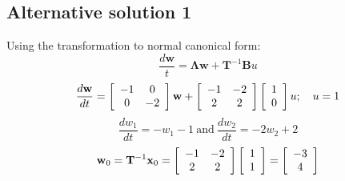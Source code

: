 \subsection*{Alternative solution 1}
Using the transformation to normal canonical form:
\[
\frac{d\mathbf{w}}{t}=\mathbf{\Lambda w}+ \mathbf{T}^{-1}\mathbf{B}u
\]
\[
\frac{{d{\bf{w}}}}{{dt}} = \left[ {\begin{array}{*{20}c}
   { - 1} & 0  \\
   0 & { - 2}  \\
\end{array}} \right]{\bf{w}} + \left[ {\begin{array}{*{20}c}
   { - 1} & { - 2}  \\
   2 & 2  \\
\end{array}} \right]\left[ {\begin{array}{*{20}c}
   1  \\
   0  \\
\end{array}} \right]u;\quad u = 1
\]
\[
\frac{dw_1}{dt}=-w_1-1\ \textrm{and}\ \frac{dw_2}{dt}=-2w_2 + 2
\]
\[
{\bf{w}}_0  = {\bf{T}}^{ - 1} {\bf{x}}_0  = \left[ {\begin{array}{*{20}c}
   { - 1} & { - 2}  \\
   2 & 2  \\
\end{array}} \right]\left[ {\begin{array}{*{20}c}
   1  \\
   1  \\
\end{array}} \right] = \left[ {\begin{array}{*{20}c}
   { - 3}  \\
   4  \\
\end{array}} \right]
\]


